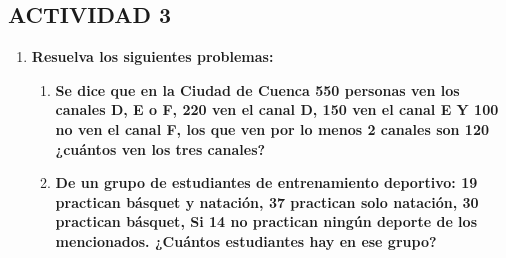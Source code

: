 \documentclass[12pt]{article}
\begin{document}
        \subsection*{\textbf{\centering ACTIVIDAD 3}}

            \begin{enumerate}
                \item \textbf{Resuelva los siguientes problemas:}
                    \begin{enumerate}
                        \item \textbf{Se dice que en la Ciudad de Cuenca 550 personas ven los canales D, E o F, 220 ven el canal D, 150 ven el canal E Y 100 no ven el canal F, los que ven por lo menos 2 canales son 120 ¿cuántos ven los tres canales?}
                        \item \textbf{De un grupo de estudiantes de entrenamiento deportivo: 19 practican básquet y natación, 37 practican solo natación, 30 practican básquet, Si 14 no practican ningún deporte de los mencionados. ¿Cuántos estudiantes hay en ese grupo?}
                    \end{enumerate}
            \end{enumerate}    
\end{document}
